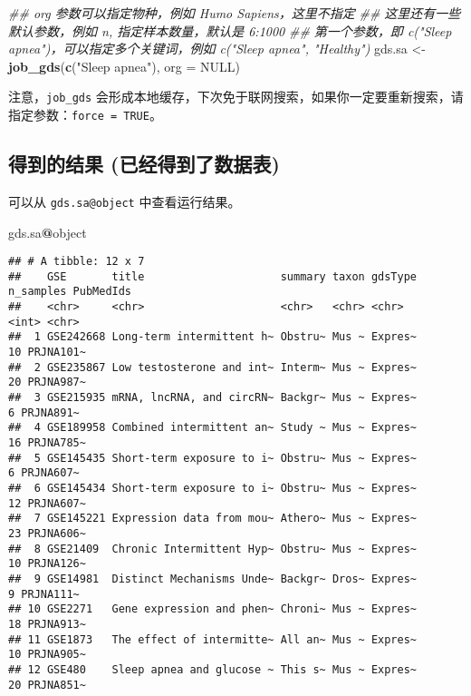 \documentclass[
]{article}
\newenvironment{Shaded}{\begin{snugshade}}{\end{snugshade}}
\newcommand{\CommentTok}[1]{\textcolor[rgb]{0.56,0.35,0.01}{\textit{#1}}}
\newcommand{\DataTypeTok}[1]{\textcolor[rgb]{0.13,0.29,0.53}{#1}}
\newcommand{\KeywordTok}[1]{\textcolor[rgb]{0.13,0.29,0.53}{\textbf{#1}}}
\newcommand{\NormalTok}[1]{#1}
\newcommand{\OperatorTok}[1]{\textcolor[rgb]{0.81,0.36,0.00}{\textbf{#1}}}
\newcommand{\OtherTok}[1]{\textcolor[rgb]{0.56,0.35,0.01}{#1}}
\newcommand{\StringTok}[1]{\textcolor[rgb]{0.31,0.60,0.02}{#1}}
\begin{document}
\begin{Shaded}
\begin{Highlighting}[]
\CommentTok{\#\# org 参数可以指定物种，例如 Humo Sapiens，这里不指定}
\CommentTok{\#\# 这里还有一些默认参数，例如 n, 指定样本数量，默认是 6:1000}
\CommentTok{\#\# 第一个参数，即 c("Sleep apnea")，可以指定多个关键词，例如 c("Sleep apnea", "Healthy")}
\NormalTok{gds.sa \textless{}{-}}\StringTok{ }\KeywordTok{job\_gds}\NormalTok{(}\KeywordTok{c}\NormalTok{(}\StringTok{"Sleep apnea"}\NormalTok{), }\DataTypeTok{org =} \OtherTok{NULL}\NormalTok{)}
\end{Highlighting}
\end{Shaded}

注意，\texttt{job\_gds} 会形成本地缓存，下次免于联网搜索，如果你一定要重新搜索，请指定参数：\texttt{force\ =\ TRUE}。

\hypertarget{ux5f97ux5230ux7684ux7ed3ux679c-ux5df2ux7ecfux5f97ux5230ux4e86ux6570ux636eux8868}{%
\subsection{得到的结果 (已经得到了数据表)}\label{ux5f97ux5230ux7684ux7ed3ux679c-ux5df2ux7ecfux5f97ux5230ux4e86ux6570ux636eux8868}}

可以从 \texttt{gds.sa@object} 中查看运行结果。

\begin{Shaded}
\begin{Highlighting}[]
\NormalTok{gds.sa}\OperatorTok{@}\NormalTok{object}
\end{Highlighting}
\end{Shaded}

\begin{verbatim}
## # A tibble: 12 x 7
##    GSE       title                     summary taxon gdsType n_samples PubMedIds
##    <chr>     <chr>                     <chr>   <chr> <chr>       <int> <chr>    
##  1 GSE242668 Long-term intermittent h~ Obstru~ Mus ~ Expres~        10 PRJNA101~
##  2 GSE235867 Low testosterone and int~ Interm~ Mus ~ Expres~        20 PRJNA987~
##  3 GSE215935 mRNA, lncRNA, and circRN~ Backgr~ Mus ~ Expres~         6 PRJNA891~
##  4 GSE189958 Combined intermittent an~ Study ~ Mus ~ Expres~        16 PRJNA785~
##  5 GSE145435 Short-term exposure to i~ Obstru~ Mus ~ Expres~         6 PRJNA607~
##  6 GSE145434 Short-term exposure to i~ Obstru~ Mus ~ Expres~        12 PRJNA607~
##  7 GSE145221 Expression data from mou~ Athero~ Mus ~ Expres~        23 PRJNA606~
##  8 GSE21409  Chronic Intermittent Hyp~ Obstru~ Mus ~ Expres~        10 PRJNA126~
##  9 GSE14981  Distinct Mechanisms Unde~ Backgr~ Dros~ Expres~         9 PRJNA111~
## 10 GSE2271   Gene expression and phen~ Chroni~ Mus ~ Expres~        18 PRJNA913~
## 11 GSE1873   The effect of intermitte~ All an~ Mus ~ Expres~        10 PRJNA905~
## 12 GSE480    Sleep apnea and glucose ~ This s~ Mus ~ Expres~        20 PRJNA851~
\end{verbatim}
\end{document}
